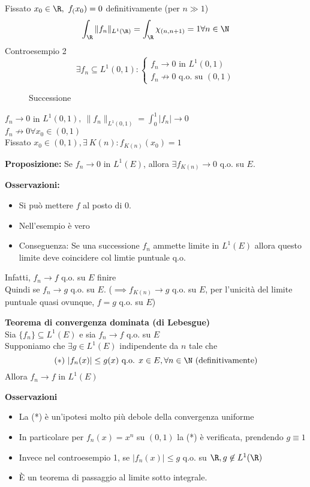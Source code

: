 Fissato $x_0\in\R,\ f_(x_0)=0$ definitivamente (per $n\gg 1$)
\[\int_{\R}^{} \|f_n\|_{L^1(\R)}=\int_{\R}^{} \chi_{(n,n+1)}=1 \forall n\in\N\]
Controesempio 2
\[\exists f_n \subseteq L^1(0,1): \begin{cases}
	f_n\to 0 \text{ in }L^1(0,1)\\
	f_n \not\to 0\text{ q.o. su }(0,1)
\end{cases} 
\]
\begin{figure}[ht]
    \centering
    \caption{Successione}
    \label{fig:disegno}
\end{figure}
$f_n\to 0$ in $L^1(0,1), \ \|f_n\|_{L^1(0,1)}=\int_{0}^{1} |f_n|\to 0 $
\\$f_n\not\to 0\forall x_0\in(0,1)$
\\Fissato $x_0\in(0,1), \exists\  K(n):f_{K(n)}(x_0)=1$ 
\begin{tcolorbox}
	\textbf{Proposizione:} Se $f_n\to 0$ in $L^1(E)$, allora $\exists f_{K(n)}\to 0$ q.o. su $E$.
\end{tcolorbox}
\textbf{Osservazioni:} 
\begin{itemize}
	\item Si può mettere $f$ al posto di 0.
	\item Nell'esempio è vero
	\item Conseguenza: Se una successione $f_n$ ammette limite in $L^1(E)$ allora questo limite deve coincidere col limtie puntuale q.o. 
\end{itemize}
Infatti, $f_n\to f$ q.o. su $E$  finire
\\Quindi se $f_n\to g$ q.o. su $E$. ($\implies f_{K(n)}\to g$ q.o. su $E$, per l'unicità del limite puntuale quasi ovunque, $f=g$ q.o. su $E$)
\begin{tcolorbox}
	\textbf{Teorema di convergenza dominata (di Lebesgue)}
	\\Sia $\{f_n\} \subseteq  L^1(E)$ e sia $f_n\to f$ q.o. su $E$\\
	Supponiamo che $\exists g\in L^1(E)$ indipendente da $n$ tale che
	\[(*)\ |f_n(x)|\le g(x)\text{ q.o. }x\in E, \forall n \in \N\text{ (definitivamente)}\]
	Allora $f_n\to f$ in $L^1(E)$
\end{tcolorbox}
\textbf{Osservazioni}
\begin{itemize}
	\item La (*) è un'ipotesi molto più debole della convergenza uniforme
	\item In particolare per $f_n(x)=x^n$ su $(0,1)$ la (*) è verificata, prendendo $g\equiv 1$
	\item Invece nel controesempio 1, se $|f_n(x)|\le g$ q.o. su $\R,g \not\in L^1(\R)$
	\item È un teorema di passaggio al limite sotto integrale.
\end{itemize}
